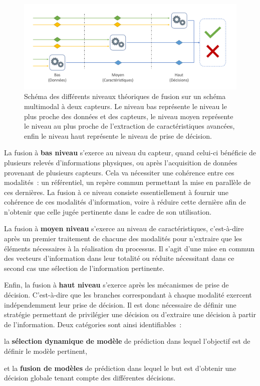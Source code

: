 \begin{figure}[H]
    \centering
    \includegraphics[width=\linewidth]{contents/chapter_3/resources/scheme_overview_fusion.pdf}
    \caption{Schéma des différents niveaux théoriques de fusion sur un schéma multimodal à deux capteurs. Le niveau bas représente le niveau le plus proche des données et des capteurs, le niveau moyen représente le niveau au plus proche de l'extraction de caractéristiques avancées, enfin le niveau haut représente le niveau de prise de décision.}
    \label{fig:scheme_overview_fusion}
\end{figure}\par

La fusion à \textbf{bas niveau} s'exerce au niveau du capteur, quand celui-ci bénéficie de plusieurs relevés d'informations physiques, ou après l'acquisition de données provenant de plusieurs capteurs. Cela va nécessiter une cohérence entre ces modalités~: un référentiel, un repère commun permettant la mise en parallèle de ces dernières. La fusion à ce niveau consiste essentiellement à fournir une cohérence de ces modalités d'information, voire à réduire cette dernière afin de n'obtenir que celle jugée pertinente dans le cadre de son utilisation.\par

La fusion à \textbf{moyen niveau} s'exerce au niveau de caractéristiques, c’est-à-dire après un premier traitement de chacune des modalités pour n'extraire que les éléments nécessaires à la réalisation du processus. Il s'agit d'une mise en commun des vecteurs d'information dans leur totalité ou réduite nécessitant dans ce second cas une sélection de l'information pertinente.\par

Enfin, la fusion à \textbf{haut niveau} s'exerce après les mécanismes de prise de décision. C’est-à-dire que les branches correspondant à chaque modalité exercent indépendemment leur prise de décision. Il est donc nécessaire de définir une stratégie permettant de privilégier une décision ou d'extraire une décision à partir de l'information. Deux catégories sont ainsi identifiables~: 
\begin{inlinerate}
    \item la \textbf{sélection dynamique de modèle} de prédiction dans lequel l'objectif est de définir le modèle pertinent,
    \item et la \textbf{fusion de modèles} de prédiction dans lequel le but est d'obtenir une décision globale tenant compte des différentes décisions.
\end{inlinerate}\par

